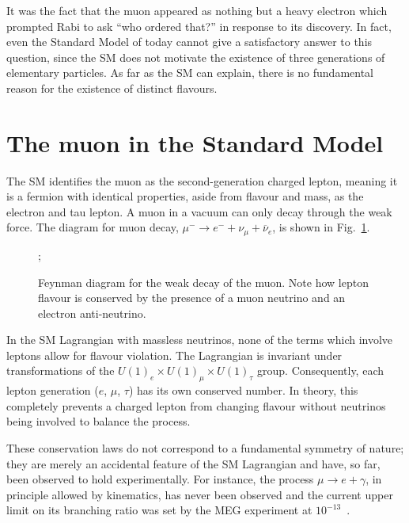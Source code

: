 It was the fact that the muon appeared as nothing but a heavy electron which
prompted Rabi to ask ``who ordered that?'' in response to its discovery. In
fact, even the Standard Model of today cannot give a satisfactory answer to this
question, since the SM does not motivate the existence of three generations of
elementary particles. As far as the SM can explain, there is no fundamental reason
for the existence of distinct flavours.

\section{The muon in the Standard Model}
% 
The SM identifies the muon as the second-generation charged lepton, meaning it
is a fermion with identical properties, aside from flavour and mass, as the electron
and tau lepton. A muon in a vacuum can only decay through the weak force. The
diagram for muon decay, $\mu^- \rightarrow e^- +  \nu_\mu + \overline{\nu}_e$,
is shown in Fig.~\ref{fig:weak_decay}.


\begin{figure}
    \centering
    ;

    \caption{ Feynman diagram for the weak decay of the muon. Note how lepton
        flavour is conserved by the presence of a muon neutrino and an electron
        anti-neutrino. }
    \label{fig:weak_decay}
\end{figure}

In the SM Lagrangian with massless neutrinos, none of the terms which involve
leptons allow for flavour violation. The Lagrangian is invariant under
transformations of the ${U(1)_e \times U(1)_\mu \times U(1)_\tau}$ group.
Consequently, each lepton generation ($e$, $\mu$, $\tau$) has its own conserved
number. In theory, this completely prevents a charged lepton from changing
flavour without neutrinos being involved to balance the process. 

These conservation laws do not correspond to a fundamental symmetry of nature;
they are merely an accidental feature of the SM Lagrangian and have, so far,
been observed to hold experimentally. 
For instance, the process ${\mu \rightarrow e + \gamma}$, in principle allowed
by kinematics, has never been observed and the current upper limit on its
branching ratio was set by the MEG experiment at
$10^{-13}$~\cite{mori2016final}. 



